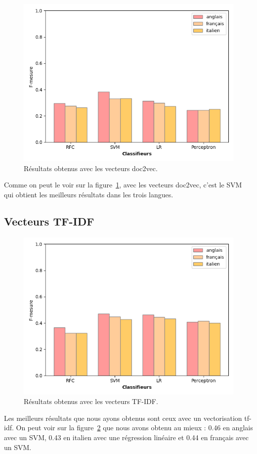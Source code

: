 \begin{figure}[t]
  \includegraphics[width=\columnwidth]{assets/comparaison_metriques_doc2vec.png}
  \caption{Résultats obtenus avec les vecteurs doc2vec.}
  \label{fig:doc2vec_comparison}
\end{figure}

Comme on peut le voir sur la figure~\ref{fig:doc2vec_comparison}, avec les vecteurs doc2vec, c'est le SVM qui obtient les meilleurs résultats dans les trois langues.

\subsection{Vecteurs TF-IDF}

\begin{figure}[t]
  \includegraphics[width=\columnwidth]{assets/comparaison_metriques_tfidf.png}
  \caption{Résultats obtenus avec les vecteurs TF-IDF.}
  \label{fig:tfidf_comparison}
\end{figure}

Les meilleurs résultats que nous ayons obtenus sont ceux avec un vectorisation tf-idf.
On peut voir sur la figure~\ref{fig:tfidf_comparison} que nous avons obtenu au mieux : 0.46 en anglais avec un SVM, 0.43 en italien avec une régression linéaire et 0.44 en français avec un SVM.